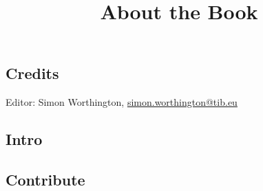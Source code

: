 \documentclass{article}
\begin{document}
\title{About the Book}

\maketitle


\subsection{Credits}\label{H1689939}



Editor: Simon Worthington, \href{mailto:simon.worthington@tib.eu}{simon.worthington@tib.eu} 


\subsection{Intro}\label{H7235491}



\subsection{Contribute}\label{H8571447}
\end{document}
